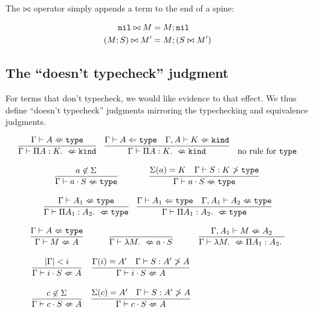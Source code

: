 \documentclass[11pt,twoside]{article}
\begin{document}
\bigskip 
{}
\bigskip 

The $\bowtie$ operator simply appends a term to the end of a spine:

\begin{align*} 
\mathtt{nil}\bowtie M &= M;\mathtt{nil}\\
(M;S)\bowtie M' &= M;(S\bowtie M')
\end{align*} 


\subsection{The ``doesn't typecheck'' judgment}

\newcommand{\NoCheck}[3][\Gamma]{#1\vdash #2 \nLeftarrow #3}
\newcommand{\NoFocus}[4][\Gamma]{#1\vdash #2 : #3 \ngtr #4}
\newcommand{\NoEquiv}[2]{#1 \not\equiv #2}

For terms that don't typecheck, we would like evidence to that
effect.  We thus define ``doesn't typecheck'' judgments mirroring
the typechecking and equivalence judgments.

\bigskip 
\framebox{$\NoCheck{K}{\Kind}$}
\bigskip 

$$
\begin{array}{ccc}
\infer{\NoCheck{\PiTyp{A}{K}}{\Kind}}{\NoCheck{A}{\Type}} &
\infer{\NoCheck{\PiTyp{A}{K}}{\Kind}}{\CheckTy{A}{\Type} & \NoCheck[\Gamma,A]{K}{\Kind}} &
\mbox{no rule for $\Type$}
\end{array} 
$$

\bigskip 
\framebox{$\NoCheck{A}{\Type}$}
\bigskip 

$$
\begin{array}{cc}
\infer{\NoCheck{a\cdot S}{\Type}}{a\not\in\Sigma} &
\infer{\NoCheck{a\cdot S}{\Type}}{\Sigma(a) = K & \NoFocus{S}{K}{\Type}} \\\\
\infer{\NoCheck{\PiTyp{A_1}{A_2}}{\Type}}{\NoCheck{A_1}{\Type}} &
\infer{\NoCheck{\PiTyp{A_1}{A_2}}{\Type}}{\CheckTy{A_1}{\Type} & \NoCheck[\Gamma,A_1]{A_2}{\Type}} 
\end{array} 
$$

\bigskip 
\framebox{$\NoCheck{M}{A}$}
\bigskip 

$$
\begin{array}{ccc}
\infer{\NoCheck{M}{A}}{\NoCheck{A}{\Type}} &
\infer{\NoCheck{\Lam{M}}{a\cdot S}}{} &
\infer{\NoCheck{\Lam{M}}{\PiTyp{A_1}{A_2}}}{\NoCheck[\Gamma,A_1]{M}{A_2}} \\\\
\infer{\NoCheck{i\cdot S}{A}}{\card{\Gamma} < i} & 
\infer{\NoCheck{i\cdot S}{A}}{\Gamma(i)=A' & \NoFocus{S}{A'}{A}} \\\\
\infer{\NoCheck{c\cdot S}{A}}{c \not\in\Sigma} & 
\infer{\NoCheck{c\cdot S}{A}}{\Sigma(c)=A' & \NoFocus{S}{A'}{A}}
\end{array} 
$$
\end{document}
